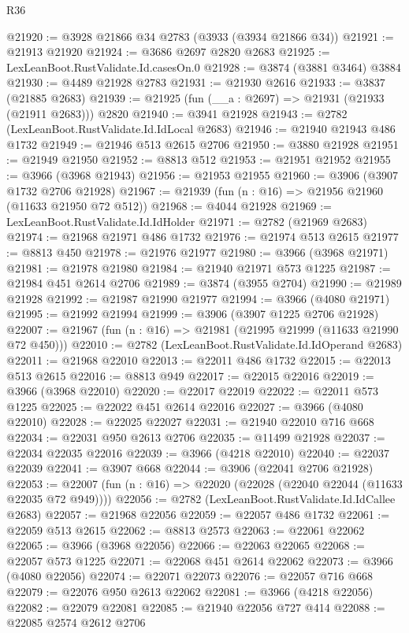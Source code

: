 \begin{lexlean}{R36}
\begin{coremodule}
@21920 := @3928 @21866 @34 @2783 (@3933 (@3934 @21866 @34))
@21921 := @21913 @21920
@21924 := @3686 @2697 @2820 @2683
@21925 := LexLeanBoot.RustValidate.Id.casesOn.{0}
@21928 := @3874 (@3881 @3464) @3884
@21930 := @4489 @21928 @2783
@21931 := @21930 @2616
@21933 := @3837 (@21885 @2683)
@21939 := @21925 (fun (__a : @2697) => @21931 (@21933 (@21911 @2683))) @2820
@21940 := @3941 @21928
@21943 := @2782 (LexLeanBoot.RustValidate.Id.IdLocal @2683)
@21946 := @21940 @21943 @486 @1732
@21949 := @21946 @513 @2615 @2706
@21950 := @3880 @21928
@21951 := @21949 @21950
@21952 := @8813 @512
@21953 := @21951 @21952
@21955 := @3966 (@3968 @21943)
@21956 := @21953 @21955
@21960 := @3906 (@3907 @1732 @2706 @21928)
@21967 := @21939 (fun (n : @16) => @21956 @21960 (@11633 @21950 @72 @512))
@21968 := @4044 @21928
@21969 := LexLeanBoot.RustValidate.Id.IdHolder
@21971 := @2782 (@21969 @2683)
@21974 := @21968 @21971 @486 @1732
@21976 := @21974 @513 @2615
@21977 := @8813 @450
@21978 := @21976 @21977
@21980 := @3966 (@3968 @21971)
@21981 := @21978 @21980
@21984 := @21940 @21971 @573 @1225
@21987 := @21984 @451 @2614 @2706
@21989 := @3874 (@3955 @2704)
@21990 := @21989 @21928
@21992 := @21987 @21990 @21977
@21994 := @3966 (@4080 @21971)
@21995 := @21992 @21994
@21999 := @3906 (@3907 @1225 @2706 @21928)
@22007 := @21967 (fun (n : @16) => @21981 (@21995 @21999 (@11633 @21990 @72 @450)))
@22010 := @2782 (LexLeanBoot.RustValidate.Id.IdOperand @2683)
@22011 := @21968 @22010
@22013 := @22011 @486 @1732
@22015 := @22013 @513 @2615
@22016 := @8813 @949
@22017 := @22015 @22016
@22019 := @3966 (@3968 @22010)
@22020 := @22017 @22019
@22022 := @22011 @573 @1225
@22025 := @22022 @451 @2614 @22016
@22027 := @3966 (@4080 @22010)
@22028 := @22025 @22027
@22031 := @21940 @22010 @716 @668
@22034 := @22031 @950 @2613 @2706
@22035 := @11499 @21928
@22037 := @22034 @22035 @22016
@22039 := @3966 (@4218 @22010)
@22040 := @22037 @22039
@22041 := @3907 @668
@22044 := @3906 (@22041 @2706 @21928)
@22053 := @22007 (fun (n : @16) => @22020 (@22028 (@22040 @22044 (@11633 @22035 @72 @949))))
@22056 := @2782 (LexLeanBoot.RustValidate.Id.IdCallee @2683)
@22057 := @21968 @22056
@22059 := @22057 @486 @1732
@22061 := @22059 @513 @2615
@22062 := @8813 @2573
@22063 := @22061 @22062
@22065 := @3966 (@3968 @22056)
@22066 := @22063 @22065
@22068 := @22057 @573 @1225
@22071 := @22068 @451 @2614 @22062
@22073 := @3966 (@4080 @22056)
@22074 := @22071 @22073
@22076 := @22057 @716 @668
@22079 := @22076 @950 @2613 @22062
@22081 := @3966 (@4218 @22056)
@22082 := @22079 @22081
@22085 := @21940 @22056 @727 @414
@22088 := @22085 @2574 @2612 @2706

\end{coremodule}
\end{lexlean}
